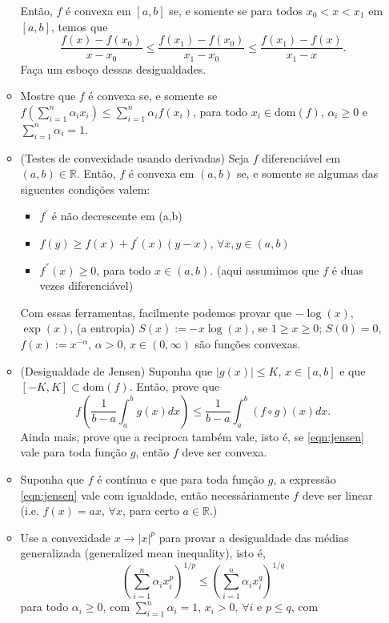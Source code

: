 \documentclass{article}
\theoremstyle{plain}
\theoremstyle{definition}
\theoremstyle{remark}
\newcommand{\R}{{\mathbb R}}
\begin{document}
\begin{enumerate}
\begin{itemize}
   Então, $f$ é convexa em $[a,b]$
   se, e somente se para todos $x_{0}<x<x_{1}$ em $[a,b]$, temos que 
   $$\frac{f(x)-f(x_{0})}{x-x_{0}}\leq 
     \frac{f(x_1)-f(x_{0})}{x_1-x_{0}}\leq
     \frac{f(x_1)-f(x)}{x_1-x}.
   $$
   Faça um esboço dessas desigualdades.
   \item Mostre que $f$ é convexa se, e somente se  $f(\sum_{i=1}^{n} \alpha_{i}x_{i}) \leq \sum_{i=1}^{n}\alpha_i f(x_{i})$, para todo $x_{i} \in \text{dom}(f)$, $\alpha_{i}\geq 0$ e $\sum_{i=1}^{n}\alpha_{i}=1$.  
   \item (Testes de convexidade usando derivadas)
   Seja $f$ diferenciável em $(a,b)\in \R$. 
   Então, $f$ é convexa em $(a,b)$ se, e somente se 
   algumas das siguentes condições valem:
     \begin{itemize}
     \item $f^{'}$ é não decrescente em (a,b)
     \item $f(y)\geq f(x)+f^{'}(x)(y-x)$, $\forall x, y \in (a,b)$
     \item $f^{''}(x)\geq 0$, para todo $x \in (a,b)$.
     (aqui assumimos que $f$ é duas vezes diferenciável)
     \end{itemize}
   Com essas ferramentas, facilmente podemos provar que $-\log(x)$, $\exp(x)$, (a entropia) $S(x):=-x\log(x)$, se $1\geq x\geq0$; $S(0)=0$, 
   $f(x):=x^{-\alpha}$, $\alpha>0$, $x \in (0,\infty)$ são funções convexas. 
   \item (Desigualdade de Jensen) Suponha que $|g(x)|\leq K$, $x \in [a,b]$ e que $[-K,K] \subset \text{dom}(f)$. Então, prove que  
   \begin{equation}\label{eqn:jensen}
    f\left(\frac{1}{b-a}\int_{a}^{b} g(x)dx\right)
     \leq \frac{1}{b-a} \int_{a}^{b} (f \circ g)(x)dx.
   \end{equation}  
    Ainda mais, prove que a reciproca também vale, isto é, se \eqref{eqn:jensen} vale para toda função $g$, então $f$
    deve ser convexa.
    \item Suponha que $f$ é contínua e que para toda função $g$, a expressão \eqref{eqn:jensen}
   vale com igualdade, então necessáriamente 
    $f$ deve ser linear (i.e. $f(x)=ax$, $\forall x$,  para certo $a \in \R$.)    
    \item Use a convexidade $x\rightarrow |x|^{p}$  para provar a desigualdade das médias generalizada
    (generalized mean inequality), isto é, 
    $$ (\sum_{i=1}^{n} \alpha_{i}x_{i}^{p})^{1/p}
     \leq (\sum_{i=1}^{n} \alpha_{i}x_{i}^{q})^{1/q}$$ para todo $\alpha_{i}\geq 0$, com $\sum_{i=1}^{n}\alpha_{i}=1$, $x_{i}>0$, $\forall i$ e $p\leq q$, com 

\end{itemize}
\end{enumerate}
\end{document}
